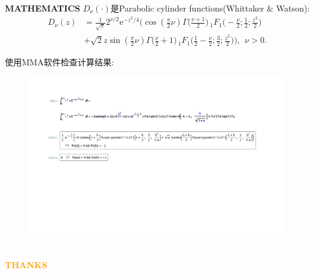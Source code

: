 \documentclass[aspectratio=169]{beamer}
\begin{document}
\begin{frame}{\textbf{{\LARGE{M}}ATHEMATICS}}
	$D_{\nu}(\cdot)$是Parabolic cylinder functions(Whittaker \& Watson):
	\begin{equation}
		\begin{split}
		D_{\nu}(z) &= \frac{1}{\sqrt{\pi}}2^{\nu/2}\mathrm{e}^{-z^2/4}\bigg( \cos(\frac{\pi}{2}\nu)\Gamma\Big(\frac{\nu+1}{2}\Big)\,_1F_1\Big(-\frac{\nu}{2};\frac{1}{2};\frac{z^2}{2}\Big)\\
		&+\sqrt{2}z\sin(\frac{\pi}{2}\nu)\Gamma\Big(\frac{\nu}{2}+1\Big)\,_1F_1\Big(\frac{1}{2} - \frac{\nu}{2};\frac{3}{2};\frac{z^2}{2}\Big)\bigg),~~\nu > 0.
		\end{split}
	\end{equation}
\end{frame}

\begin{frame}{使用MMA软件检查计算结果:}
    \begin{figure}
		\centering
		\includegraphics[width=1.0\linewidth, trim=70 0 100 0,clip]{images/print.pdf}
	\end{figure}
\end{frame}
%




\section{}
\begin{frame}{}
\centering
\Huge\bfseries
\textcolor{orange}{THANKS}
\end{frame}
\end{document}
